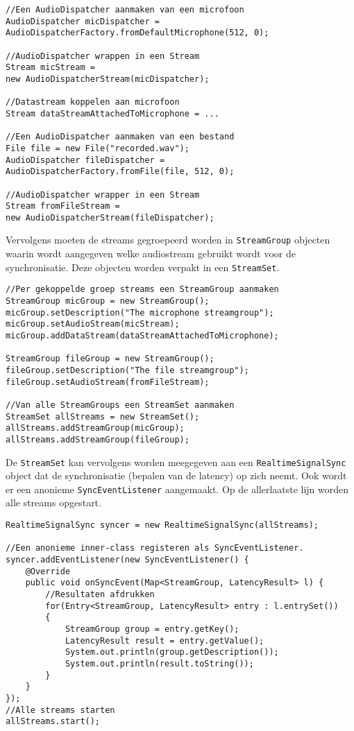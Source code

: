 \begin{lstlisting}
//Een AudioDispatcher aanmaken van een microfoon
AudioDispatcher micDispatcher =
AudioDispatcherFactory.fromDefaultMicrophone(512, 0);

//AudioDispatcher wrappen in een Stream
Stream micStream = 
new AudioDispatcherStream(micDispatcher);

//Datastream koppelen aan microfoon
Stream dataStreamAttachedToMicrophone = ...

//Een AudioDispatcher aanmaken van een bestand
File file = new File("recorded.wav");
AudioDispatcher fileDispatcher = 
AudioDispatcherFactory.fromFile(file, 512, 0);

//AudioDispatcher wrapper in een Stream
Stream fromFileStream = 
new AudioDispatcherStream(fileDispatcher);	
\end{lstlisting}
\newpage
Vervolgens moeten de streams gegroepeerd worden in \texttt{StreamGroup} objecten waarin wordt aangegeven welke audiostream gebruikt wordt voor de synchronisatie. Deze objecten worden verpakt in een \texttt{StreamSet}. \\

\begin{lstlisting}
//Per gekoppelde groep streams een StreamGroup aanmaken
StreamGroup micGroup = new StreamGroup();
micGroup.setDescription("The microphone streamgroup");
micGroup.setAudioStream(micStream);
micGroup.addDataStream(dataStreamAttachedToMicrophone);

StreamGroup fileGroup = new StreamGroup();
fileGroup.setDescription("The file streamgroup");
fileGroup.setAudioStream(fromFileStream);

//Van alle StreamGroups een StreamSet aanmaken
StreamSet allStreams = new StreamSet();
allStreams.addStreamGroup(micGroup);
allStreams.addStreamGroup(fileGroup);
\end{lstlisting}

De \texttt{StreamSet} kan vervolgens worden meegegeven aan een \texttt{RealtimeSignalSync} object dat de synchronisatie (bepalen van de latency) op zich neemt. Ook wordt er een anonieme \texttt{SyncEventListener} aangemaakt. Op de allerlaatste lijn worden alle streams opgestart.  \\

\begin{lstlisting}
RealtimeSignalSync syncer = new RealtimeSignalSync(allStreams);

//Een anonieme inner-class registeren als SyncEventListener.
syncer.addEventListener(new SyncEventListener() {
	@Override
	public void onSyncEvent(Map<StreamGroup, LatencyResult> l) {
		//Resultaten afdrukken
		for(Entry<StreamGroup, LatencyResult> entry : l.entrySet()) 
		{
			StreamGroup group = entry.getKey();
			LatencyResult result = entry.getValue();
			System.out.println(group.getDescription());
			System.out.println(result.toString());
		}
	}
});
//Alle streams starten
allStreams.start();
\end{lstlisting}

